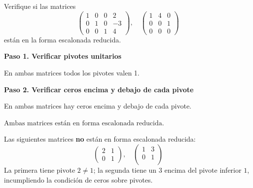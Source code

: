 \begin{example}
Verifique si las matrices
\[
\begin{pmatrix}
\boxed{1} & 0 & 0 & 2 \\
0 & \boxed{1} & 0 & -3 \\
0 & 0 & \boxed{1} & 4
\end{pmatrix}, \quad
\begin{pmatrix}
\boxed{1} & 4 & 0 \\
0 & 0 & \boxed{1} \\
0 & 0 & 0
\end{pmatrix}
\]
están en la forma escalonada reducida.
\begin{myproof}
\textbf{Paso 1. Verificar pivotes unitarios}

En ambas matrices todos los pivotes valen 1. \checkmark

\textbf{Paso 2. Verificar ceros encima y debajo de cada pivote}

En ambas matrices hay ceros encima y debajo de cada pivote. \checkmark

$\boxed{\text{Ambas matrices están en forma escalonada reducida.}}$
\end{myproof}
\end{example}

\begin{example}
Las siguientes matrices \textbf{no} están en forma escalonada reducida:
\[
\begin{pmatrix}
\boxed{2} & 1 \\
0 & \boxed{1}
\end{pmatrix}, \quad
\begin{pmatrix}
\boxed{1} & 3 \\
0 & \boxed{1} \\
\end{pmatrix}
\]
La primera tiene pivote $\boxed{2}\neq 1$; la segunda tiene un $3$ encima del pivote inferior $\boxed{1}$, incumpliendo la condición de ceros sobre pivotes.
\end{example}


